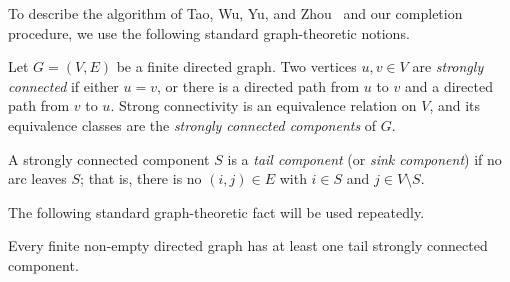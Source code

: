 To describe the algorithm of Tao, Wu, Yu, and Zhou~\cite{tao2025existence} and our completion procedure, we use the following standard graph-theoretic notions.

\begin{definition}
\label{def:scc}
Let $G=(V,E)$ be a finite directed graph. Two vertices \(u,v\in V\) are \emph{strongly connected} if either \(u=v\), or there is a directed path from \(u\) to \(v\) and a directed path from \(v\) to \(u\). Strong connectivity is an equivalence relation on $V$, and its equivalence classes are the \emph{strongly connected components} of $G$.

A strongly connected component $S$ is a \emph{tail component} (or \emph{sink component}) if no arc leaves $S$; that is, there is no $(i,j)\in E$ with $i\in S$ and $j\in V\setminus S$.
\end{definition}

The following standard graph-theoretic fact will be used repeatedly.

\begin{lemma}
\label{lem:tail-scc-exists}
Every finite non-empty directed graph has at least one tail strongly connected component.
\end{lemma}






